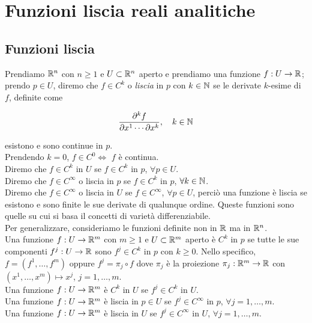 \section{Funzioni liscia reali analitiche}

\subsection{Funzioni liscia}

Prendiamo $ \mathbb{R}^{n} $ con $ n \geq 1 $ e $ U \subset \mathbb{R}^{n} $ aperto e prendiamo una funzione $ f : U \to \mathbb{R} $; prendo $ p \in U $, diremo che $ f \in C^{k} $ o \textit{liscia} in $ p $ con $ k \in \mathbb{N} $ se le derivate $ k $-esime di $ f $, definite come

\begin{equation}
	\dfrac{\partial^{k} f}{\partial x^{1} \cdots \partial x^{k}}, \quad k \in \mathbb{N}
\end{equation}

esistono e sono continue in $ p $.\\
Prendendo $ k = 0 $, $ f \in C^{0} \iff $ $ f $ è continua.\\
Diremo che $ f \in C^{k} $ in $ U $ se $ f \in C^{k} $ in $ p $, $ \forall p \in U $.\\
Diremo che $ f \in C^{\infty} $ o liscia in $ p $ se $ f \in C^{k} $ in $ p $, $ \forall k \in \mathbb{N} $.\\
Diremo che $ f \in C^{\infty} $ o liscia in $ U $ se $ f \in C^{\infty} $, $ \forall p \in U $, perciò una funzione è liscia se esistono e sono finite le sue derivate di qualunque ordine. Queste funzioni sono quelle su cui si basa il concetti di varietà differenziabile.\\

Per generalizzare, consideriamo le funzioni definite non in $ \mathbb{R} $ ma in $ \mathbb{R}^{n} $.\\
Una funzione $ f : U \to \mathbb{R}^{m} $ con $ m \geq 1 $ e $ U \subset \mathbb{R}^{m} $ aperto è $ C^{k} $ in $ p $ se tutte le sue componenti $ f^{j} : U \to \mathbb{R} $ sono $ f^{j} \in C^{k} $ in $ p $ con $ k \geq 0 $. Nello specifico, $ f = (f^{1}, \dots, f^{m}) $ oppure $ f^{j} = \pi_{j} \circ f $ dove $ \pi_{j} $ è la proiezione $ \pi_{j} : \mathbb{R}^{m} \to \mathbb{R} $ con $ (x^{1}, \dots, x^{m}) \mapsto x^{j} $, $ j = 1, \dots, m $.\\
Una funzione $ f : U \to \mathbb{R}^{m} $ è $ C^{k} $ in $ U $ se $ f^{j} \in C^{k} $ in $ U $.\\
Una funzione $ f : U \to \mathbb{R}^{m} $ è liscia in $ p \in U $ se $ f^{j} \in C^{\infty} $ in $ p $, $ \forall j = 1, \dots, m $.\\
Una funzione $ f : U \to \mathbb{R}^{m} $ è liscia in $ U $ se $ f^{j} \in C^{\infty} $ in $ U $, $ \forall j = 1, \dots, m $.

